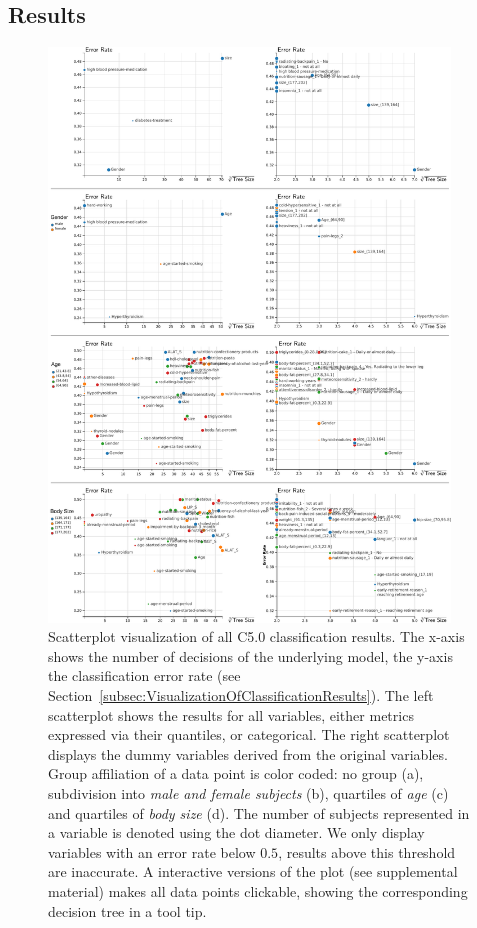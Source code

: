 \documentclass[a4paper,twoside]{style/article}
\begin{document}
\subsection{Results}
\begin{figure}[p!]
  \centering
  \includegraphics[width=0.95\textwidth]{figures/results}
  \caption{
Scatterplot visualization of all C5.0 classification results.
The x-axis shows the number of decisions of the underlying model, the y-axis the classification error rate (see Section~\ref{subsec:VisualizationOfClassificationResults}).
The left scatterplot shows the results for all variables, either metrics expressed via their quantiles, or categorical.
The right scatterplot displays the dummy variables derived from the original variables.
Group affiliation of a data point is color coded:
no group (a), subdivision into \emph{male and female subjects} (b), quartiles of \emph{age} (c) and quartiles of \emph{body size} (d).
The number of subjects represented in a variable is denoted using the dot diameter.
We only display variables with an error rate below $0.5$, results above this threshold are inaccurate.
A interactive versions of the plot (see supplemental material) makes all data points clickable, showing the corresponding decision tree in a tool tip.
}
  \label{fig:results}
\end{figure}
\end{document}
